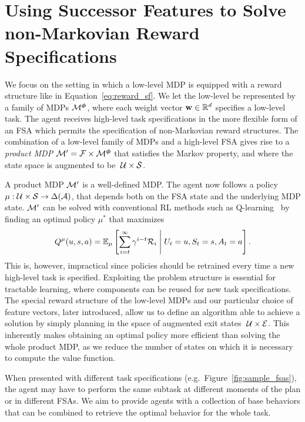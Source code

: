 \section{Using Successor Features to Solve non-Markovian Reward Specifications}

We focus on the setting in which a low-level MDP is equipped with a reward structure like in Equation~\eqref{eq:reward_sf}. We let the low-level be represented by a family of MDPs $\mathcal{M}^{\boldsymbol{\phi}}$, where each weight vector $\mathbf{w}\in\mathbb{R}^d$ specifies a low-level task. The agent receives high-level task specifications in the more flexible form of an FSA which permits the specification of non-Markovian reward structures. The combination of a low-level family of MDPs and a high-level FSA gives rise to a \textit{product MDP} $\mathcal{M}'=\mathcal{F}\times\mathcal{M}^{\boldsymbol{\phi}}$ that satisfies the Markov property, and where the state space is augmented to be $\;\mathcal{U}\times\mathcal{S}$.

A product MDP $\mathcal{M}'$ is a well-defined MDP. The agent now follows a policy $\mu:\mathcal{U}\times\mathcal{S}\rightarrow\Delta(\mathcal{A})$, that depends both on the FSA state and the underlying MDP state. $\mathcal{M}'$ can be solved with conventional RL methods such as Q-learning~\citep{Watkins1992} by finding an optimal policy $\mu^*$ that maximizes
\begin{equation*}
Q^\mu(u, s, a) = \mathbb{E}_{\mu}\left[\sum_{i=t}^\infty \gamma^{i-t}\mathcal{R}_i\;\middle\lvert\;U_t= u, S_t=s, A_t=a\right].
\end{equation*}
This is, however, impractical since policies should be retrained every time a new high-level task is specified. Exploiting the problem structure is essential for tractable learning, where components can be reused for new task specifications. The special reward structure of the low-level MDPs and our particular choice of feature vectors, later introduced, allow us to define an algorithm able to achieve a solution by simply planning in the space of augmented exit states $\;\mathcal{U}\times\mathcal{E}$. This inherently makes obtaining an optimal policy more efficient than solving the whole product MDP, as we reduce the number of states on which it is necessary to compute the value function.

 When presented with different task specifications (e.g.~Figure~\ref{fig:sample_fsas}), the agent may have to perform the same subtask at different moments of the plan or in different FSAs. We aim to provide agents with a collection of base behaviors that can be combined to retrieve the optimal behavior for the whole task.

